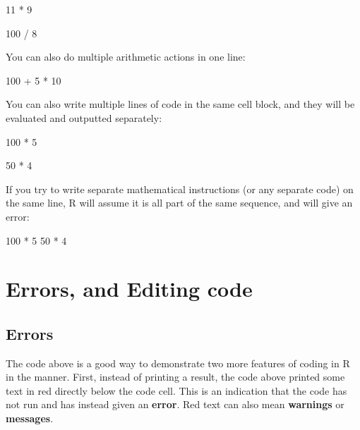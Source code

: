 \documentclass[
  letterpaper,
  DIV=11,
  numbers=noendperiod]{scrreprt}
\newenvironment{Shaded}{\begin{snugshade}}{\end{snugshade}}
\newcommand{\NormalTok}[1]{\textcolor[rgb]{0.00,0.23,0.31}{#1}}
\begin{document}
\begin{Shaded}
\begin{Highlighting}[]
\NormalTok{11 * 9}
\end{Highlighting}
\end{Shaded}

\begin{Shaded}
\begin{Highlighting}[]
\NormalTok{100 / 8}
\end{Highlighting}
\end{Shaded}

You can also do multiple arithmetic actions in one line:

\begin{Shaded}
\begin{Highlighting}[]
\NormalTok{100 + 5 * 10}
\end{Highlighting}
\end{Shaded}

You can also write multiple lines of code in the same cell block, and
they will be evaluated and outputted separately:

\begin{Shaded}
\begin{Highlighting}[]
\NormalTok{100 * 5}

\NormalTok{50 * 4}
\end{Highlighting}
\end{Shaded}

If you try to write separate mathematical instructions (or any separate
code) on the same line, R will assume it is all part of the same
sequence, and will give an error:

\begin{Shaded}
\begin{Highlighting}[]

\NormalTok{100 * 5 50 * 4}

\end{Highlighting}
\end{Shaded}

\section{Errors, and Editing code}\label{errors-and-editing-code}

\subsection{Errors}\label{errors}

The code above is a good way to demonstrate two more features of coding
in R in the manner. First, instead of printing a result, the code above
printed some text in red directly below the code cell. This is an
indication that the code has not run and has instead given an
\textbf{error}. Red text can also mean \textbf{warnings} or
\textbf{messages}.
\end{document}
